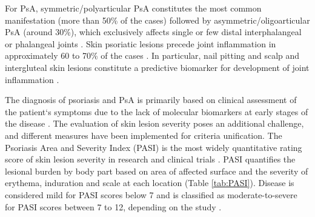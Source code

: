 For PsA, symmetric/polyarticular PsA constitutes the most common manifestation (more than 50\% of the cases) followed by asymmetric/oligoarticular PsA (around 30\%), which exclusively affects single or few distal interphalangeal or phalangeal joints \parencite{Reich2009, McGonagle2011}. Skin psoriatic lesions precede joint inflammation in approximately 60 to 70\% of the cases \parencite{Gladman2005, McGonagle2011}. In particular, nail pitting and scalp and intergluteal skin lesions constitute a predictive biomarker for development of joint inflammation \parencite{Moll1973,Griffiths2007,McGonagle2011}.

The diagnosis of psoriasis and PsA is primarily based on clinical assessment of the patient`s symptoms due to the lack of molecular biomarkers at early stages of the disease \parencite{Villanova2013}. The evaluation of skin lesion severity poses an additional challenge, and different measures have been implemented for criteria unification. The Psoriasis Area and Severity Index (PASI) is the most widely quantitative rating score of skin lesion severity in research and clinical trials \parencite{Fredriksson1978,Finlay2005}. PASI quantifies the lesional burden by body part based on area of affected surface and the severity of erythema, induration and scale at each location (Table \ref{tab:PASI}). Disease is considered mild for PASI scores below 7 and is classified as moderate-to-severe for PASI scores between 7 to 12, depending on the study \parencite{Finlay2005, Schmitt2005,Langewouters2008}.


